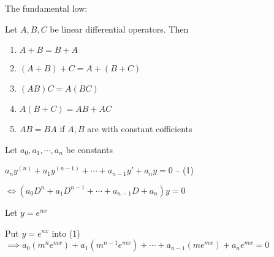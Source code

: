 The fundamental low:

Let $A,B,C$ be linear differential operators. Then

\begin{enumerate}
	\item $A + B = B + A$
	\item $(A + B) + C = A + (B + C)$
	\item $(AB)C = A(BC)$
	\item $A(B + C) = AB + AC$
	\item $AB = BA$ if $A,B$ are with  constant cofficients
\end{enumerate}

Let $a_0,a_1,\cdots , a_n$ be constants

$a_ny^{(n)} + a_1y^{(n-1)} + \cdots + a_{n-1}y' + a_ny = 0$ -- (1) 

$\Leftrightarrow (a_0D^n + a_1D^{n-1} + \cdots + a_{n - 1}D + a_n)y = 0$

Let $y = e^{nx}$

Put $y = e^{nx}$ into (1) $\implies a_0 (m^ne^{mx}) + a_1(m^{n-1}e^{mx}) + \cdots + a_{n-1}(me^{mx}) + a_n e^{mx} = 0$









